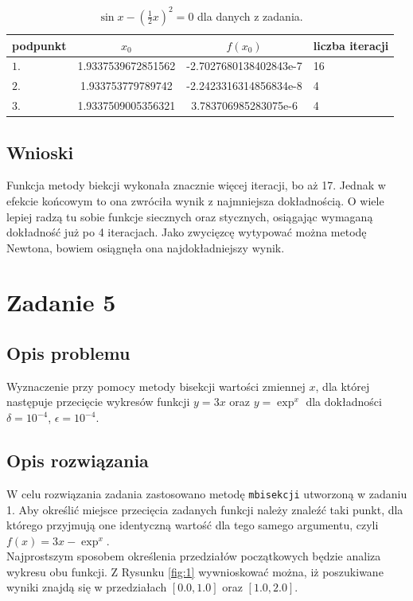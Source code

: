 \documentclass{classrep}
\begin{document}
		\begin{table}[!hpbt]
        		\centering
        		\footnotesize
			\begin{tabular}{lSSl} \toprule
				{podpunkt} & {$x_0$} & {$f(x_0)$} & {liczba iteracji}\\ \midrule
				$1.$ & 1.9337539672851562 & -2.7027680138402843e-7 & 16 \\ 
	 			$2.$ & 1.933753779789742 & -2.2423316314856834e-8 & 4 \\
	 			$3.$ & 1.9337509005356321 & 3.783706985283075e-6 & 4 \\ \bottomrule
	 		\end{tabular}
	 		\caption{$\sin{x}-(\frac{1}{2}x)^2=0$ dla danych z zadania.}
			\label{table:1}
		\end{table}	
		
	\subsection{Wnioski}
		Funkcja metody biekcji wykonała znacznie więcej iteracji, bo aż 17. Jednak w efekcie końcowym to ona zwróciła wynik z najmniejsza dokładnością. 
		O wiele lepiej radzą tu sobie funkcje siecznych oraz stycznych, osiągając wymaganą dokładność już po 4 iteracjach. Jako zwycięzcę wytypować można metodę Newtona, bowiem osiągnęła ona najdokładniejszy wynik.
		
\section{Zadanie 5}
	\subsection{Opis problemu}
		Wyznaczenie przy pomocy metody bisekcji wartości zmiennej $x$, dla której następuje przecięcie wykresów funkcji $y=3x$ oraz $y=\exp^x$ dla dokładności $\delta=10^{-4}$, $\epsilon=10^{-4}$.
	
	\subsection{Opis rozwiązania}
		W celu rozwiązania zadania zastosowano metodę \texttt{mbisekcji} utworzoną w zadaniu 1.
		Aby określić miejsce przecięcia zadanych funkcji należy znaleźć taki punkt, dla którego przyjmują one identyczną wartość dla tego samego argumentu, czyli $f(x)=3x-\exp^x$. 	\\
		 Najprostszym sposobem określenia przedziałów początkowych będzie analiza wykresu obu funkcji. Z Rysunku \ref{fig:1} wywnioskować można, iż poszukiwane wyniki znajdą się w przedziałach $[0.0,1.0]$ oraz $[1.0,2.0]$.
		
\end{document}
